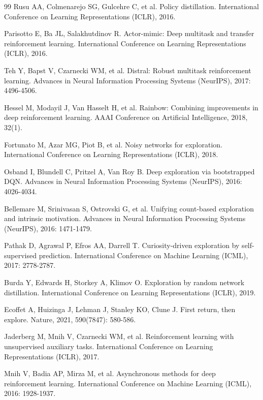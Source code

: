 \documentclass[12pt,a4paper]{ctexart}
\begin{document}
\begin{thebibliography}{99}
 Rusu AA, Colmenarejo SG, Gulcehre C, et al. Policy distillation. International Conference on Learning Representations (ICLR), 2016.

 Parisotto E, Ba JL, Salakhutdinov R. Actor-mimic: Deep multitask and transfer reinforcement learning. International Conference on Learning Representations (ICLR), 2016.

 Teh Y, Bapst V, Czarnecki WM, et al. Distral: Robust multitask reinforcement learning. Advances in Neural Information Processing Systems (NeurIPS), 2017: 4496-4506.

 Hessel M, Modayil J, Van Hasselt H, et al. Rainbow: Combining improvements in deep reinforcement learning. AAAI Conference on Artificial Intelligence, 2018, 32(1).

 Fortunato M, Azar MG, Piot B, et al. Noisy networks for exploration. International Conference on Learning Representations (ICLR), 2018.

 Osband I, Blundell C, Pritzel A, Van Roy B. Deep exploration via bootstrapped DQN. Advances in Neural Information Processing Systems (NeurIPS), 2016: 4026-4034.

 Bellemare M, Srinivasan S, Ostrovski G, et al. Unifying count-based exploration and intrinsic motivation. Advances in Neural Information Processing Systems (NeurIPS), 2016: 1471-1479.

 Pathak D, Agrawal P, Efros AA, Darrell T. Curiosity-driven exploration by self-supervised prediction. International Conference on Machine Learning (ICML), 2017: 2778-2787.

 Burda Y, Edwards H, Storkey A, Klimov O. Exploration by random network distillation. International Conference on Learning Representations (ICLR), 2019.

 Ecoffet A, Huizinga J, Lehman J, Stanley KO, Clune J. First return, then explore. Nature, 2021, 590(7847): 580-586.

 Jaderberg M, Mnih V, Czarnecki WM, et al. Reinforcement learning with unsupervised auxiliary tasks. International Conference on Learning Representations (ICLR), 2017.

 Mnih V, Badia AP, Mirza M, et al. Asynchronous methods for deep reinforcement learning. International Conference on Machine Learning (ICML), 2016: 1928-1937.


\end{thebibliography}
\end{document}
